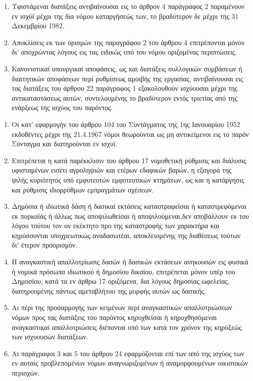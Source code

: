 \documentclass[twoside, a4paper, 10pt]{article}
\begin{document}
\begin{multicols}{2}
\begin{enumerate}
\begin{BigQuote}
\begin{enumerate}
  \item[1.] Υφιστάμεναι διατάξεις αντιβαίνουσαι εις το άρθρον 4 παράγραφος 2 παραμένουν εν ισχύϊ μέχρι της δια νόμου καταργήσεώς των, το βραδύτερον δε μέχρι της 31 Δεκεμβρίου 1982.
  \item[2.] Αποκλίσεις εκ των ορισμών της παραγράφου 2 του άρθρου 4 επιτρέπονται μόνον δι' αποχρώντας λόγους εις τας ειδικώς υπό του νόμου οριζομένας περιπτώσεις.
  \item[3.] Κανονιστικαί υπουργικαί αποφάσεις, ως και διατάξεις συλλογικών συμβάσεων ή διαιτητικών αποφάσεων περί ρυθμίσεως αμοιβής της εργασίας, αντιβαίνουσαι εις τας διατάξεις του άρθρου 22 παράγραφος 1 εξακολουθούν ισχύουσαι μέχρι της αντικαταστάσεως αυτών, συντελουμένης το βραδύτερον εντός τριετίας από της ενάρξεως της ισχύος του παρόντος.
\end{enumerate}

\begin{enumerate}
  \item[1.] Οι κατ' εφαρμογήν του άρθρου 104 του Συντάγματος της 1ης Ιανουαρίου 1952 εκδοθέντες μέχρι της 21.4.1967 νόμοι θεωρούνται ως μη αντικείμενοι εις το παρόν Σύνταγμα και διατηρούνται εν ισχυϊ.
  \item[2.] Επιτρέπεται η κατά παρέκκλισιν του άρθρου 17 νομοθετική ρύθμισις και διάλυσις υφισταμένων εισέτι αγροληψιών και ετέρων εδαφικών βαρών, η εξαγορά της ψιλής κυριότητος υπό εμφυτευτών εμφυτευτικών κτημάτων, ως και η κατάργησις και ρύθμισις ιδιορρύθμων εμπραγμάτων σχέσεων.
  \item[3.] Δημόσια ή ιδιωτικά δάση ή δασικαί εκτάσεις καταστραφείσαι ή καταστρεφόμεναι  εκ πυρκαϊάς ή άλλως πως αποψιλωθείσαι ή αποψιλούμεναι,δεν αποβάλλουν εκ του λόγου τούτου τον ον εκέκτητο προ της καταστροφής των χαρακτήρα και κηρύσσονται υποχρεωτικώς αναδασωτέαι, αποκλειομένης της διαθέσεως τούτων δι' έτερον προορισμόν.
  \item[4.] Η αναγκαστική απαλλοτρίωσις δασών ή δασικών εκτάσεων ανηκουσών εις φυσικά ή νομικά πρόσωπα ιδιωτικού ή δημοσίου δικαίου, επιτρέπεται μόνον υπέρ του Δημοσίου, κατά τα εν άρθρω 17 οριζόμενα, δια λόγους δημοσίας ωφελείας, διατηρουμένης πάντως αμεταβλήτου της μορφής αυτών ως δασικής.
  \item[5.] Αι πέρι της προσαρμογής των κειμένων περί αναγκαστικών απαλλοτριώσεων νόμων προς τας διατάξεις του παρόντος κηρυχθείσαι ή κηρυχθησόμεναι αναγκαστικαί απαλλοτριώσεις διέπονται υπό των κατά τον χρόνον της κηρύξεώς των ισχυουσών διατάξεων.
  \item[6.] Αι παράγραφοι 3 και 5 του άρθρου 24 εφαρμόζονται επί των από της ισχύος των εν αυταίς προβλεπομένων νόμων αναγνωριζομένων ή αναμορφουμένων οικιστικών περιοχών.
\end{enumerate}


\end{BigQuote}
\end{enumerate}
\end{multicols}
\end{document}
